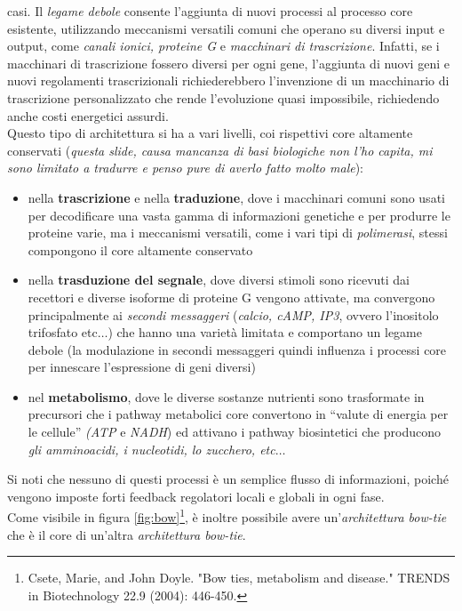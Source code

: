\documentclass[a4paper,12pt, oneside]{book}
\begin{document}
casi. Il \textit{legame debole} consente l'aggiunta di nuovi processi al
processo core esistente, utilizzando meccanismi versatili comuni che operano su
diversi input e output, come \textit{canali ionici, proteine G} e
\textit{macchinari di trascrizione}. Infatti, se i macchinari di trascrizione
fossero 
diversi per ogni gene, l'aggiunta di nuovi geni e nuovi regolamenti
trascrizionali richiederebbero l'invenzione di un macchinario di trascrizione
personalizzato che rende l'evoluzione quasi impossibile, richiedendo anche costi
energetici assurdi.\\
Questo tipo di architettura si ha a vari livelli, coi rispettivi core altamente
conservati (\textit{questa slide, causa mancanza di basi biologiche non l'ho
  capita, mi sono limitato a tradurre e penso pure di averlo fatto molto
  male}):
\begin{itemize}
  \item nella \textbf{trascrizione} e nella\textbf{ traduzione}, dove i
  macchinari 
  comuni sono usati per decodificare una vasta gamma di informazioni genetiche e
  per produrre le proteine varie, ma i meccanismi versatili, come i vari tipi di
  \textit{polimerasi}, stessi
  compongono il core altamente conservato 
  \item nella \textbf{trasduzione del segnale}, dove diversi stimoli sono
  ricevuti dai recettori e diverse isoforme di proteine G vengono attivate, ma
  convergono principalmente ai \textit{secondi messaggeri} (\textit{calcio,
    cAMP, IP3}, ovvero l'inositolo trifosfato etc$\ldots$) che hanno una varietà
  limitata 
  e comportano un legame debole (la modulazione in secondi messaggeri quindi
  influenza i processi core per innescare l'espressione di geni diversi) 
  \item nel \textbf{metabolismo}, dove le diverse sostanze nutrienti sono
  trasformate in precursori che i pathway metabolici core convertono in
  ``valute di energia per le cellule'' \textit{(ATP} e \textit{NADH}) ed
  attivano i pathway  biosintetici che producono \textit{gli amminoacidi, i
    nucleotidi, 
  lo zucchero, etc$\ldots$}  
\end{itemize}
Si noti che nessuno di questi processi è un semplice flusso di informazioni,
poiché vengono imposte forti feedback regolatori locali e globali in ogni
fase. \\
Come visibile in figura \ref{fig:bow}\footnote{Csete, Marie, and John Doyle. "Bow ties,
  metabolism and disease." TRENDS in Biotechnology 22.9 (2004): 446-450.}, è
inoltre possibile avere 
un'\textit{architettura bow-tie} che è il core di un'altra \textit{architettura
  bow-tie}.
\end{document}
